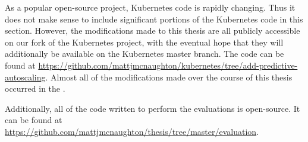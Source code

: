 As a popular open-source project, Kubernetes code is rapidly changing. Thus it
does not make sense to include significant portions of the Kubernetes code in
this section. However, the modifications made to this thesis are all publicly
accessible on our fork of the Kubernetes project, with the eventual hope that
they will additionally be available on the Kubernetes master branch. The code
can be found at
\url{https://github.com/mattjmcnaughton/kubernetes/tree/add-predictive-autoscaling}.
Almost all of the modifications made over the course of this thesis occurred in
the .

Additionally, all of the code written to perform the evaluations is open-source.
It can be found at
\url{https://github.com/mattjmcnaughton/thesis/tree/master/evaluation}.

